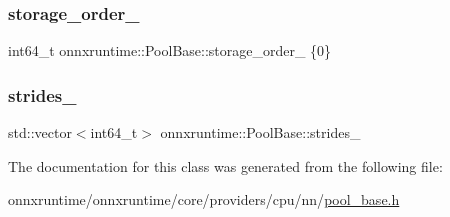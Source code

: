 \subsubsection{\texorpdfstring{storage\+\_\+order\+\_\+}{storage\_order\_}}
{\footnotesize\ttfamily int64\+\_\+t onnxruntime\+::\+Pool\+Base\+::storage\+\_\+order\+\_\+ \{0\}\hspace{0.3cm}{\ttfamily [protected]}}

\mbox{\label{classonnxruntime_1_1PoolBase_a12246aa19006cba0dfb1fd125108bb91}} 
\subsubsection{\texorpdfstring{strides\+\_\+}{strides\_}}
{\footnotesize\ttfamily std\+::vector$<$int64\+\_\+t$>$ onnxruntime\+::\+Pool\+Base\+::strides\+\_\+\hspace{0.3cm}{\ttfamily [protected]}}



The documentation for this class was generated from the following file\+:\begin{DoxyCompactItemize}
\item 
onnxruntime/onnxruntime/core/providers/cpu/nn/\mbox{\hyperlink{pool__base_8h}{pool\+\_\+base.\+h}}\end{DoxyCompactItemize}
